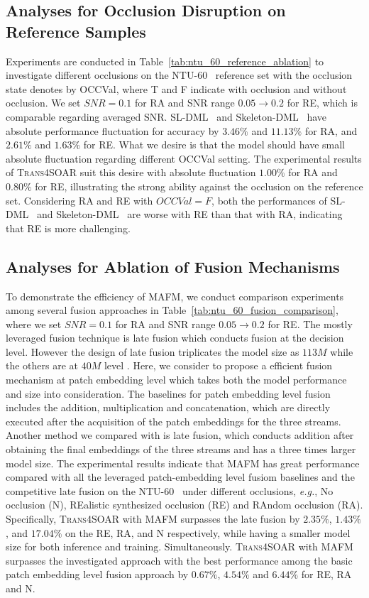 \documentclass[lettersize,journal]{IEEEtran}
\begin{document}
\subsection{Analyses for Occlusion Disruption on Reference Samples}
Experiments are conducted in Table~\ref{tab:ntu_60_reference_ablation} to investigate different occlusions on the NTU-60~\cite{shahroudy2016ntu} reference set with the occlusion state denotes by OCCVal, where T and F indicate with occlusion and without occlusion. We set $SNR=0.1$ for RA and SNR range $0.05\rightarrow0.2$ for RE, which is comparable regarding averaged SNR. SL-DML~\cite{memmesheimer2021sl} and Skeleton-DML~\cite{memmesheimer2020skeleton_dml} have absolute performance fluctuation for accuracy by $3.46\%$ and $11.13\%$ for RA, and $2.61\%$ and $1.63\%$ for RE. What we desire is that the model should have small absolute fluctuation regarding different OCCVal setting. The experimental results of \textsc{Trans4SOAR} suit this desire with absolute fluctuation $1.00\%$ for RA and $0.80\%$ for RE, illustrating the strong ability against the occlusion on the reference set. Considering RA and RE with $OCCVal=F$, both the performances of SL-DML~\cite{memmesheimer2021sl} and Skeleton-DML~\cite{memmesheimer2020skeleton_dml} are worse with RE than that with RA, indicating that RE is more challenging.
\subsection{Analyses for Ablation of Fusion Mechanisms}
To demonstrate the efficiency of MAFM, we conduct comparison experiments among several fusion approaches in Table~\ref{tab:ntu_60_fusion_comparison}, where we set $SNR=0.1$ for RA and SNR range $0.05\rightarrow0.2$ for RE.
The mostly leveraged fusion technique is late fusion which conducts fusion at the decision level.
However the design of late fusion triplicates the model size as $113M$ while the others are at $40M$ level .
Here, we consider to propose a efficient fusion mechanism at patch embedding level which takes both the model performance and size into consideration.
The baselines for patch embedding level fusion includes the addition, multiplication and concatenation, which are directly executed after the acquisition of the patch embeddings for the three streams.
Another method we compared with is late fusion, which conducts addition after obtaining the final embeddings of the three streams and has a three times larger model size. 
The experimental results indicate that MAFM has great performance compared with all the leveraged patch-embedding level fusiom baselines and the competitive late fusion on the NTU-60~\cite{shahroudy2016ntu} under different occlusions, \textit{e.g.}, No occlusion (N), REalistic synthesized occlusion (RE) and RAndom occlusion (RA). Specifically, \textsc{Trans4SOAR} with MAFM surpasses the late fusion by $2.35\%$, $1.43\%$, and $17.04\%$ on the RE, RA, and N respectively, while having a smaller model size for both inference and training.
Simultaneously. \textsc{Trans4SOAR} with MAFM surpasses the investigated approach with the best performance among the basic patch embedding level fusion approach by $0.67\%$, $4.54\%$ and $6.44\%$ for RE, RA and N.
\end{document}
